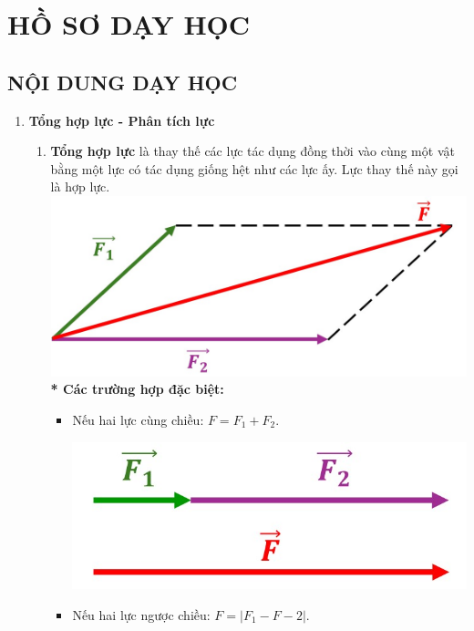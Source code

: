 \section{HỒ SƠ DẠY HỌC}
\subsection{NỘI DUNG DẠY HỌC}
\begin{enumerate}[label=\bfseries\Roman*.]
	\item \textbf{Tổng hợp lực - Phân tích lực}
	\begin{enumerate}[label=\bfseries\arabic*., leftmargin=1cm]
		\item \textbf{Tổng hợp lực} là thay thế các lực tác dụng đồng thời vào cùng một vật bằng một lực có tác dụng giống hệt như các lực ấy. Lực thay thế này gọi là hợp lực.\\
		{\includegraphics[scale=0.4]{figs/G10-BAI9-12}}
		\textbf{* Các trường hợp đặc biệt:}
		\begin{itemize}[label=$\bullet$]
			\item Nếu hai lực cùng chiều: $F=F_1+F_2$.
			\begin{center}
				\includegraphics[scale=0.4]{figs/G10-BAI9-13}
			\end{center}
			\item Nếu hai lực ngược chiều: $F=\left|F_1-F-2\right|$.

\end{itemize}
\end{enumerate}
\end{enumerate}

